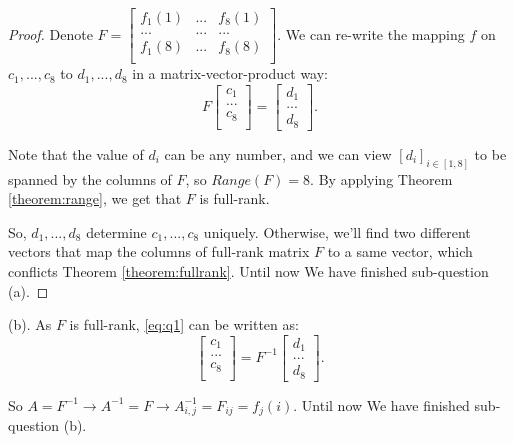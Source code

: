 \begin{proof}
    Denote $F = \begin{bmatrix}
        f_1(1) & ... & f_8(1)\\
        ...   & ... & ... \\
        f_1(8) & ... & f_8(8)\\
    \end{bmatrix}$.
    We can re-write the mapping $f$ on $c_1, ..., c_8$ to 
    $d_1, ..., d_8$ in a matrix-vector-product way:
    \begin{equation*}
        \label{eq:q1}
        F
        \begin{bmatrix}
            c_1 \\ ... \\ c_8 \\
        \end{bmatrix} 
        = 
        \begin{bmatrix}
            d_1 \\ ... \\ d_8 
        \end{bmatrix} .
    \end{equation*}

    Note that the value of $d_i$ can be any number, 
    and we can view $[d_i]_{i\in[1,8]}$ to be spanned by
    the columns of $F$, so $Range(F) = 8$. By applying 
    Theorem \ref{theorem:range}, we get that $F$ is full-rank.
    
    So, $d_1, ..., d_8$ determine $c_1, ..., c_8$ uniquely.
    Otherwise, we'll find two different vectors that map 
    the columns of full-rank matrix $F$ to a same vector, 
    which conflicts Theorem \ref{theorem:fullrank}. 
    Until now We have finished sub-question (a).
\end{proof}

(b). As $F$ is full-rank, \eqref{eq:q1} can be written as:
\begin{equation*}
    \label{eq:q1}
    \begin{bmatrix}
        c_1 \\ ... \\ c_8 \\
    \end{bmatrix} 
    = 
    F^{-1}
    \begin{bmatrix}
        d_1 \\ ... \\ d_8 
    \end{bmatrix} .
\end{equation*}

So $A = F^{-1} \rightarrow A^{-1} = F 
\rightarrow A^{-1}_{i,j} = F_{ij} = f_j(i)$.
Until now We have finished sub-question (b).




